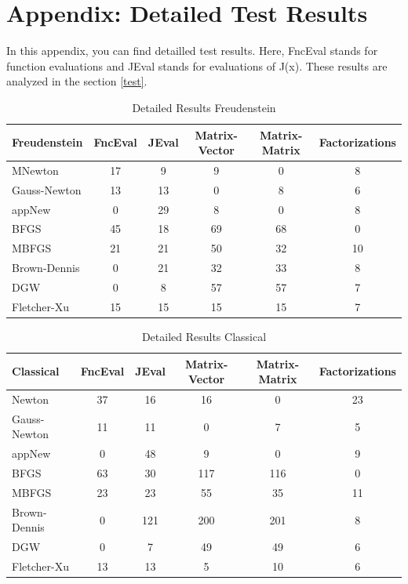 \documentclass{article}
\theoremstyle{plain}%
\theoremstyle{definition}
\begin{document}
\section{Appendix: Detailed Test Results}
In this appendix, you can find detailled test results. Here, FncEval stands for function evaluations and
JEval stands for evaluations of J(x). These results are analyzed in the section \ref{test}.
\begin{table}[H]
  \centering
  \begin{tabular}{|l|c|c|c|c|c|}
    \hline
  \textbf{Freudenstein} & FncEval &JEval& Matrix-Vector &Matrix-Matrix & Factorizations  \\ \hline
 MNewton &17&9&9&0&8 \\ \hline
Gauss-Newton &13&13&0&8&6 \\ \hline
 appNew &0&29&8&0&8 \\ \hline
 BFGS &45&18&69&68&0 \\ \hline
 MBFGS &21&21&50&32&10 \\ \hline
 Brown-Dennis &0&21&32&33&8 \\ \hline
 DGW &0&8&57&57&7 \\ \hline
 Fletcher-Xu &15&15&15&15&7 \\ \hline
  \end{tabular}
  \caption{Detailed Results Freudenstein}
  \label{tab:Freud}
\end{table}
\begin{table}[H]
  \centering
 \begin{tabular}{|l|c|c|c|c|c|}
    \hline
  \textbf{Classical} & FncEval &JEval& Matrix-Vector &Matrix-Matrix & Factorizations  \\ \hline
  Newton &37&16&16&0&23 \\ \hline
Gauss-Newton &11&11&0&7&5 \\ \hline
 appNew &0&48&9&0&9 \\ \hline
 BFGS &63&30&117&116&0 \\ \hline
 MBFGS &23&23&55&35&11 \\ \hline
 Brown-Dennis &0&121&200&201&8 \\ \hline
 DGW &0&7&49&49&6 \\ \hline
 Fletcher-Xu &13&13&5&10&6 \\ \hline
  \end{tabular}
  \caption{Detailed Results Classical}
  \label{tab:Class}
\end{table}
\end{document}
